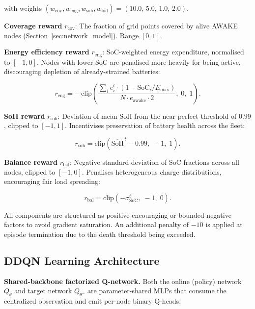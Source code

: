 \documentclass[journal]{IEEEtran}
\begin{document}
with weights
$(w_{\text{cov}}, w_{\text{eng}}, w_{\text{soh}}, w_{\text{bal}})
= (10.0,\, 5.0,\, 1.0,\, 2.0)$.

\textbf{Coverage reward} $r_{\text{cov}}$: The fraction of grid points
covered by alive AWAKE nodes (Section~\ref{sec:network_model}).
Range $[0, 1]$.

\textbf{Energy efficiency reward} $r_{\text{eng}}$: SoC-weighted energy
expenditure, normalised to $[-1, 0]$. Nodes with lower SoC are
penalised more heavily for being active, discouraging depletion of
already-strained batteries:

\begin{equation}
  r_{\text{eng}} = -\,\mathrm{clip}\!\left(
    \frac{\displaystyle\sum_i e_i^t \cdot
          (1 - \text{SoC}_i / E_{\max})}
         {N \cdot e_{\text{awake}} \cdot 2},\;
    0,\; 1\right).
  \label{eq:r_eng}
\end{equation}

\textbf{SoH reward} $r_{\text{soh}}$: Deviation of mean SoH from the
near-perfect threshold of $0.99$, clipped to $[-1, 1]$. Incentivises
preservation of battery health across the fleet:

\begin{equation}
  r_{\text{soh}} = \mathrm{clip}\!\left(
    \overline{\text{SoH}}^{\,t} - 0.99,\; -1,\; 1\right).
  \label{eq:r_soh}
\end{equation}

\textbf{Balance reward} $r_{\text{bal}}$: Negative standard deviation
of SoC fractions across all nodes, clipped to $[-1, 0]$. Penalises
heterogeneous charge distributions, encouraging fair load spreading:

\begin{equation}
  r_{\text{bal}} = \mathrm{clip}\!\left(
    -\sigma_{\text{SoC}}^t,\; -1,\; 0\right).
  \label{eq:r_bal}
\end{equation}

All components are structured as positive-encouraging or
bounded-negative factors to avoid gradient saturation. An additional
penalty of $-10$ is applied at episode termination due to the death
threshold being exceeded.

\subsection{DDQN Learning Architecture}
\label{sec:ddqn_arch}

\textbf{Shared-backbone factorized Q-network.} Both the online (policy)
network $Q_\theta$ and target network $Q_{\theta^-}$ are
parameter-shared MLPs that consume the centralized observation and emit
per-node binary Q-heads:
\end{document}
